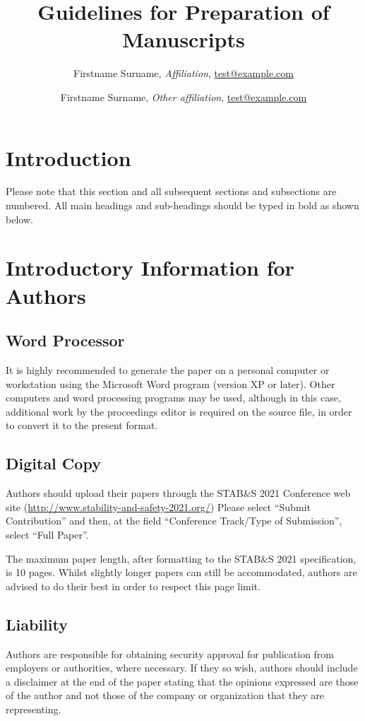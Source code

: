 \documentclass{stabs2021}
\title{Guidelines for Preparation of Manuscripts}
\author{
  Firstname Surname, \textit{Affiliation},
  \href{mailto:test@example.com}{test@example.com}
  \and
  Firstname Surname, \textit{Other affiliation},
  \href{mailto:test@example.com}{test@example.com}
}
\begin{document}
\makestabstitle

\section{Introduction}

Please note that this section and all subsequent sections and
subsections are numbered.  All main headings and sub-headings should
be typed in bold as shown below.

\section{Introductory Information for Authors}

\subsection{Word Processor}

It is highly recommended to generate the paper on a personal computer
or workstation using the Microsoft Word program (version XP or
later). Other computers and word processing programs may be used,
although in this case, additional work by the proceedings editor is
required on the source file, in order to convert it to the present
format.

\subsection{Digital Copy}

Authors should upload their papers through the STAB\&S 2021 Conference
web site (\url{http://www.stability-and-safety-2021.org/}) Please
select ``Submit Contribution'' and then, at the field ``Conference
Track/Type of Submission'', select ``Full Paper''.

The maximum paper length, after formatting to the STAB\&S 2021
specification, is 10 pages. Whilst slightly longer papers can still be
accommodated, authors are advised to do their best in order to respect
this page limit.

\subsection{Liability}

Authors are responsible for obtaining security approval for
publication from employers or authorities, where necessary. If they so
wish, authors should include a disclaimer at the end of the paper
stating that the opinions expressed are those of the author and not
those of the company or organization that they are representing.
\end{document}
